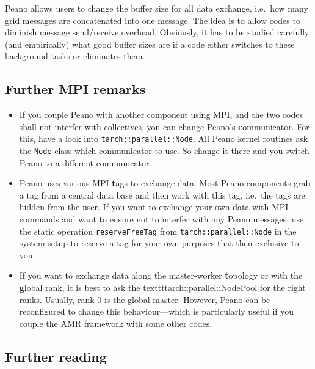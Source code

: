 \noindent
Peano allows users to change the buffer size for all data exchange, i.e.~how
many grid messages are concatenated into one message.
The idea is to allow codes to diminish message send/receive overhead.
Obviously, it has to be studied carefully (and empirically) what good buffer
sizes are if a code either switches to these background tasks or eliminates
them.


\subsection{Further MPI remarks}

\begin{itemize}
  \item If you couple Peano with another component using MPI, and the two codes
  shall not interfer with collectives, you can change Peano's {\textbf
  communicator}.
  For this, have a look into \texttt{tarch::parallel::Node}. All Peano kernel
  routines ask the \texttt{Node} class which communicator to use. So change it
  there and you switch Peano to a different communicator.
  \item Peano uses various MPI {\textbf tags} to exchange data. Most Peano
  components grab a tag from a central data base and then work with this tag,
  i.e.~the tags are hidden from the user. If you want to exchange your own data
  with MPI commands and want to ensure not to interfer with any Peano messages,
  use the static operation \texttt{reserveFreeTag} from \linebreak
  \texttt{tarch::parallel::Node} in the system setup to reserve a tag for your
  own purposes that then exclusive to you.
  \item If you want to exchange data along the master-worker {\textbf topology} or
  with the {\textbf global rank}, it is best to ask the
  texttt{tarch::parallel::NodePool} for the right ranks. Usually, rank 0 is the
  global master. However, Peano can be reconfigured to change this
  behaviour---which is particularly useful if you couple the AMR framework with
  some other codes.
\end{itemize}



\subsection*{Further reading}

